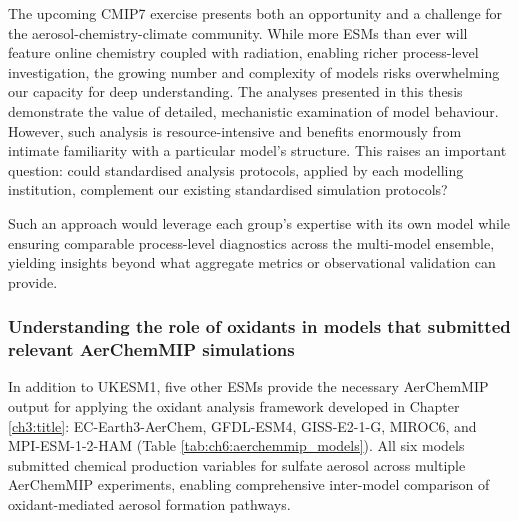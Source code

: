 


The upcoming CMIP7 exercise presents both an opportunity and a challenge for the aerosol-chemistry-climate community. While more ESMs than ever will feature online chemistry coupled with radiation, enabling richer process-level investigation, the growing number and complexity of models risks overwhelming our capacity for deep understanding. The analyses presented in this thesis demonstrate the value of detailed, mechanistic examination of model behaviour. However, such analysis is resource-intensive and benefits enormously from intimate familiarity with a particular model's structure. This raises an important question: could standardised analysis protocols, applied by each modelling institution, complement our existing standardised simulation protocols? 

Such an approach would leverage each group's expertise with its own model while ensuring comparable process-level diagnostics across the multi-model ensemble, yielding insights beyond what aggregate metrics or observational validation can provide.

\subsubsection{Understanding the role of oxidants in models that submitted relevant AerChemMIP simulations}

In addition to UKESM1, five other ESMs provide the necessary AerChemMIP output for applying the oxidant analysis framework developed in Chapter \ref{ch3:title}: EC-Earth3-AerChem, GFDL-ESM4, GISS-E2-1-G, MIROC6, and MPI-ESM-1-2-HAM (Table \ref{tab:ch6:aerchemmip_models}). All six models submitted chemical production variables for sulfate aerosol across multiple AerChemMIP experiments, enabling comprehensive inter-model comparison of oxidant-mediated aerosol formation pathways.

